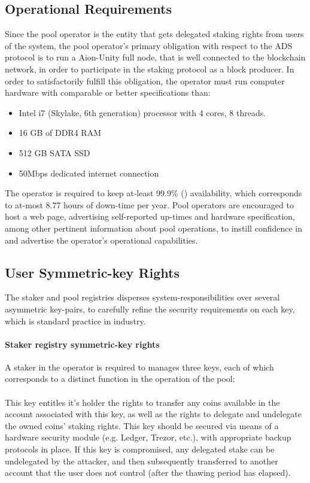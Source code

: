 \subsection{Operational Requirements} \label{operator_requirements}
Since the pool operator is the entity that gets delegated staking rights from users of the system, the pool operator's primary obligation with respect to the ADS protocol is to run a Aion-Unity full node, that is well connected to the blockchain network, in order to participate in the staking protocol as a block producer. In order to satisfactorily fulfill this obligation, the operator must run computer hardware with comparable or better specifications than:
\begin{itemize}
    \item Intel i7 (Skylake, 6th generation) processor with 4 cores, 8 threads.
    \item 16 GB of DDR4 RAM 
    \item 512 GB SATA SSD
    \item 50Mbps dedicated internet connection  
\end{itemize}
The operator is required to keep at-least 99.9\% () availability, which corresponds to at-most 8.77 hours of down-time per year. Pool operators are encouraged to host a web page, advertising self-reported up-times and hardware specification, among other pertinent information about pool operations, to instill confidence in and advertise the operator's operational capabilities. 

\subsection{User Symmetric-key Rights } 
The staker and pool registries disperses system-responsibilities over several asymmetric key-pairs, to carefully refine the security requirements on each key, which is standard practice in industry.

\paragraph{Staker registry symmetric-key rights} A staker in the  operator is required to manages three keys, each of which corresponds to a distinct function in the operation of the pool: 



\paragraph{} This key entitles it's holder the rights to transfer any coins available in the account associated with this key, as well as the rights to delegate and undelegate the owned coins' staking rights. This key should be secured via means of a hardware security module (e.g. Ledger, Trezor, etc.), with appropriate backup protocols in place. If this key is compromised, any delegated stake can be undelegated by the attacker, and then subsequently transferred to another account that the user does not control (after the thawing period has elapsed). 

